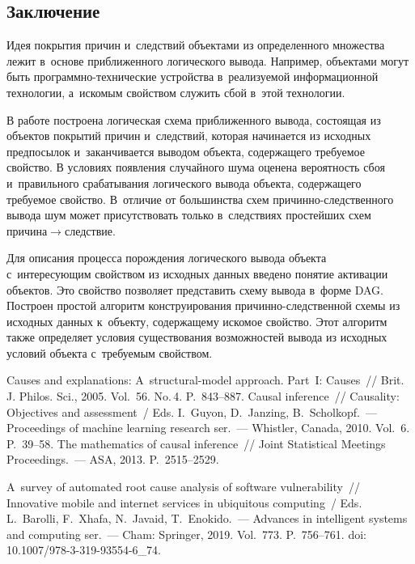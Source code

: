 \begin{multicols}{2}
  \section{Заключение }
  
  Идея покрытия причин и~следствий объектами из определенного множества 
лежит в~основе приближенного логического вывода. Например, объектами могут 
быть программно-технические устройства в~реализуемой информационной 
технологии, а~искомым свойством служить сбой в~этой технологии.

  
   В работе построена логическая схема приближенного вывода, состоящая из 
объектов покрытий причин и~следствий, которая начинается из исходных 
предпосылок и~заканчивается выводом объекта, содержащего требуемое свойство. 
В условиях появления случайного шума оценена вероятность сбоя и~правильного 
срабатывания логического вывода объекта, содержащего требуемое свойство. 
В~отличие от большинства схем при\-чин\-но-след\-ст\-вен\-но\-го вывода шум 
может присутствовать только в~следствиях простейших схем  
при\-чи\-на\;$\to$\;след\-ст\-вие. 

  
  Для описания процесса порождения логического вывода объекта 
с~интересующим свойством из исходных данных введено понятие активации 
объектов. Это свойство позволяет представить схему вывода в~форме DAG. 
Построен простой алгоритм конструирования при\-чин\-но-след\-ст\-вен\-ной 
схемы из исходных данных к~объекту, содержащему искомое свойство. Этот 
алгоритм также определяет условия существования возможностей вывода из 
исходных условий объекта с~требуемым свой\-ст\-вом. 
{

}

  
{\small\frenchspacing
 {\baselineskip=11.5pt
 \begin{thebibliography}{99}
 Causes and explanations: A~structural-model approach. 
Part~I: Causes~// Brit. J. Philos. Sci., 2005. Vol.~56. No.\,4. P.~843--887. 
 Causal inference~// Causality: Objectives and assessment~/ Eds. I.~Guyon, D.~Janzing, B.~Scholkopf.~--- Proceedings of machine learning research 
ser.~--- Whistler, Canada, 2010. Vol.~6. P.~39--58. 
 The mathematics of causal inference~// Joint Statistical Meetings Proceedings.~--- ASA, 
2013. P.~2515--2529. 

 A~survey of automated root cause analysis of software vulnerability~// 
Innovative mobile and internet services in ubiquitous computing~/ Eds. L.~Barolli, F.~Xhafa, 
N.~Javaid, T.~Enokido.~--- Advances in intelligent systems and computing ser.~--- Cham: Springer, 
2019. Vol.~773. P.~756--761. doi: 10.1007/978-3-319-93554-6\_74.


\end{thebibliography}}}
\end{multicols}
